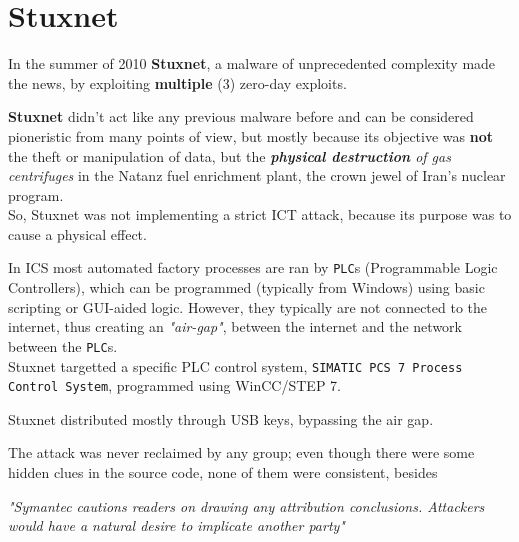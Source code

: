 \chapter{Stuxnet}

In the summer of 2010 \textbf{Stuxnet}, a malware of unprecedented complexity made the
news, by exploiting \textbf{multiple} (3) zero-day exploits.

\textbf{Stuxnet} didn’t act like any previous malware before and can be considered pioneristic from many points of view, 
but mostly
because its objective was \textbf{not} the theft or manipulation of data,
but the \textit{\textbf{physical destruction} of gas centrifuges} in the Natanz fuel
enrichment plant, the crown jewel of Iran’s nuclear program.\\
So, Stuxnet was not implementing a strict ICT attack, because its purpose was to cause a physical effect.

In ICS most automated factory processes are ran by \texttt{PLC}s (Programmable Logic Controllers),
which can be programmed (typically from Windows) using basic scripting or GUI-aided logic.
However, they typically are not connected to the internet, thus creating an \textit{"air-gap"}, between the internet and the network between the \texttt{PLC}s.\\
Stuxnet targetted a specific PLC control system, \texttt{SIMATIC PCS 7 Process Control System}, programmed using WinCC/STEP 7.

Stuxnet distributed mostly through USB keys, bypassing the air gap.

\nl

The attack was never reclaimed by any group; even though there were some hidden clues in the source code, none of them were consistent, besides
\begin{center}
   \textit{"Symantec cautions readers on drawing any attribution conclusions.
   Attackers would have a natural desire to implicate another party"}
\end{center}
